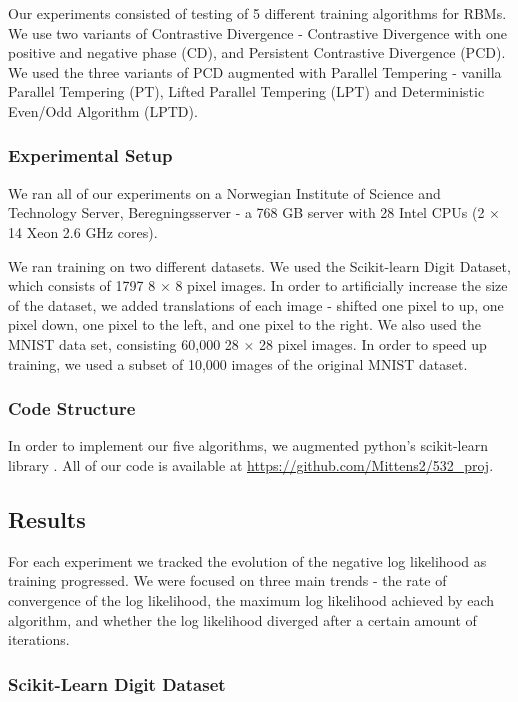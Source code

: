 Our experiments consisted of testing of 5 different training algorithms for RBMs. We use two variants of Contrastive Divergence  - Contrastive Divergence with one positive and negative phase (CD), and Persistent Contrastive Divergence (PCD). We used the three variants of PCD augmented with Parallel Tempering - vanilla Parallel Tempering (PT), Lifted Parallel Tempering (LPT) and Deterministic Even/Odd Algorithm (LPTD). 

\subsubsection{Experimental Setup}
We ran all of our experiments on a Norwegian Institute of Science and Technology Server, Beregningsserver - a 768 GB server with 28 Intel CPUs (2 $\times$ 14 Xeon 2.6 GHz cores).

We ran training on two different datasets. We used the Scikit-learn Digit Dataset, which consists of 1797 8 $\times$ 8 pixel images. In order to artificially increase the size of the dataset, we added translations of each image - shifted one pixel to up, one pixel down, one pixel to the left, and one pixel to the right. We also used the MNIST data set, consisting 60,000 28 $\times$ 28 pixel images. In order to speed up training, we used a subset of 10,000 images of the original MNIST dataset.

\subsubsection{Code Structure}
In order to implement our five algorithms, we augmented python's scikit-learn library \cite{pedregosa2011scikit}. All of our code is available at \url{https://github.com/Mittens2/532_proj}.

\subsection{Results}
For each experiment we tracked the evolution of the negative log likelihood as training progressed. We were focused on three main trends - the rate of convergence of the log likelihood, the maximum log likelihood achieved by each algorithm, and whether the log likelihood diverged after a certain amount of iterations.

\subsubsection{Scikit-Learn Digit Dataset}

